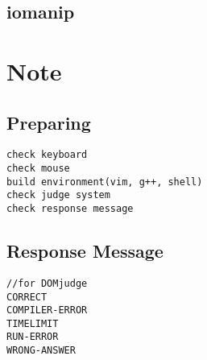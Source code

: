 \documentclass[a4paper, landscape, 8pt]{article}
\begin{document}
\begin{multicols*}{3}
\subsection{iomanip}


\section{Note}
\subsection{Preparing}
\begin{lstlisting}[]
check keyboard
check mouse
build environment(vim, g++, shell)
check judge system
check response message
\end{lstlisting}
\subsection{Response Message}
\begin{lstlisting}[]
//for DOMjudge
CORRECT
COMPILER-ERROR
TIMELIMIT
RUN-ERROR
WRONG-ANSWER
\end{lstlisting}

\end{multicols*}
\end{document}
